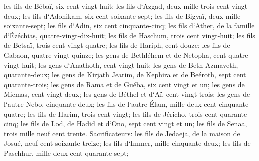 \verse les fils de Bébaï, six cent vingt-huit; 
\verse les fils d`Azgad, deux mille trois cent vingt-deux; 
\verse les fils d`Adonikam, six cent soixante-sept; 
\verse les fils de Bigvaï, deux mille soixante-sept; 
\verse les fils d`Adin, six cent cinquante-cinq; 
\verse les fils d`Ather, de la famille d`Ézéchias, quatre-vingt-dix-huit; 
\verse les fils de Haschum, trois cent vingt-huit; 
\verse les fils de Betsaï, trois cent vingt-quatre; 
\verse les fils de Hariph, cent douze; 
\verse les fils de Gabaon, quatre-vingt-quinze; 
\verse les gens de Bethléhem et de Netopha, cent quatre-vingt-huit; 
\verse les gens d`Anathoth, cent vingt-huit; 
\verse les gens de Beth Azmaveth, quarante-deux; 
\verse les gens de Kirjath Jearim, de Kephira et de Beéroth, sept cent quarante-trois; 
\verse les gens de Rama et de Guéba, six cent vingt et un; 
\verse les gens de Micmas, cent vingt-deux; 
\verse les gens de Béthel et d`Aï, cent vingt-trois; 
\verse les gens de l`autre Nebo, cinquante-deux; 
\verse les fils de l`autre Élam, mille deux cent cinquante-quatre; 
\verse les fils de Harim, trois cent vingt; 
\verse les fils de Jéricho, trois cent quarante-cinq; 
\verse les fils de Lod, de Hadid et d`Ono, sept cent vingt et un; 
\verse les fils de Senaa, trois mille neuf cent trente. 
\verse Sacrificateurs: les fils de Jedaeja, de la maison de Josué, neuf cent soixante-treize; 
\verse les fils d`Immer, mille cinquante-deux; 
\verse les fils de Paschhur, mille deux cent quarante-sept; 
